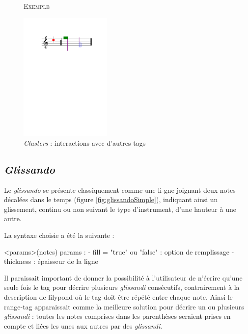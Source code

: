 \documentclass{article}
\newenvironment{gmncode}	{\vspace{-2mm}\small\verbatim}{\endverbatim\vspace{-2mm}}
\newcommand{\exemple}		{\vspace{2mm}\hspace*{-3mm}\textsc{Exemple}}
\begin{document}
\begin{figure}[h]
\exemple
\begin{gmncode}
[
  \cluster<color="red", hdx=1, hdy=3>({a})
  \cluster<size=0.5>({f, c2})
  \noteFormat<color="purple">
  \headsReverse
  \cluster<color="green", size=2>({f, g2})
  \cluster<"blue">({d1/2, g})
]
\end{gmncode}
\begin{center}
\includegraphics[width=45mm]{img/partitions/clusterInteractions.pdf}
\end{center}
\caption{\emph{Clusters} : interactions avec d'autres tags}
\label{fig:clusterInteractions}
\end{figure}
%


\subsection{\emph{Glissando}}\label{subsec:glissando}

Le \emph{glissando} se présente classiquement comme une li-gne joignant deux notes décalées dans le temps (figure \ref{fig:glissandoSimple}), indiquant ainsi un glissement, continu ou non suivant le type d'instrument, d'une hauteur à une autre.

La syntaxe choisie a été la suivante :

\begin{gmncode}
  \glissando<params>(notes)
  params : 
    - fill = "true" ou "false" : 
      option de remplissage
    - thickness : épaisseur de la ligne
\end{gmncode}

Il paraissait important de donner la possibilité à l'utilisateur de n'écrire qu'une seule fois le tag pour décrire plusieurs \emph{glissandi} consécutifs, contrairement à la description de lilypond où le tag doit être répété entre chaque note. Ainsi le range-tag apparaissait comme la meilleure solution pour décrire un ou plusieurs \emph{glissandi} : toutes les notes comprises dans les parenthèses seraient prises en compte et liées les unes aux autres par des \emph{glissandi}. 
\end{document}
